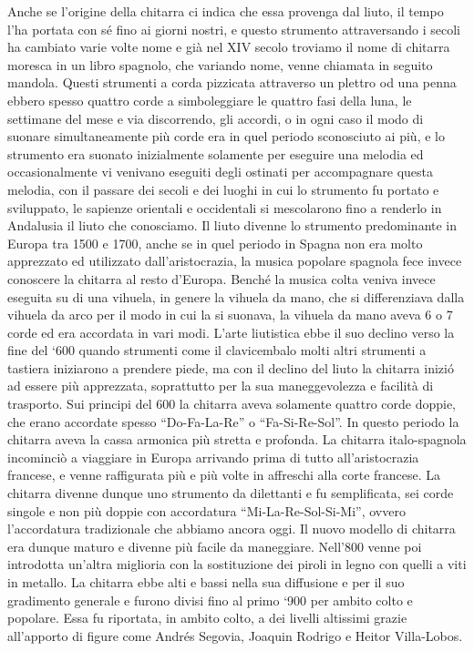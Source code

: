 \documentclass[oneside]{article}
\begin{document}
\begin{multicols*}{2}
Anche se l’origine della chitarra ci indica che essa provenga dal liuto, il tempo l’ha portata con sé fino ai giorni nostri, e questo strumento attraversando i secoli ha cambiato varie volte nome e già nel XIV secolo troviamo il nome di chitarra moresca in un libro spagnolo, che variando nome, venne chiamata in seguito mandola.
Questi strumenti a corda pizzicata attraverso un plettro od una penna ebbero spesso quattro corde a simboleggiare le quattro fasi della luna, le settimane del mese e via discorrendo, gli accordi, o in ogni caso il modo di suonare simultaneamente più corde era in quel periodo sconosciuto ai più, e lo strumento era suonato inizialmente solamente per eseguire una melodia ed occasionalmente vi venivano eseguiti degli ostinati per accompagnare questa melodia, con il passare dei secoli e dei luoghi in cui lo strumento fu portato e sviluppato, le sapienze orientali e occidentali si mescolarono fino a renderlo in Andalusia il liuto che conosciamo.
Il liuto divenne lo strumento predominante in Europa tra 1500 e 1700, anche se in quel periodo in Spagna non era molto apprezzato ed utilizzato dall’aristocrazia, la musica popolare spagnola fece invece conoscere la chitarra al resto d’Europa. Benché la musica colta veniva invece eseguita su di una vihuela, in genere la vihuela da mano, che si differenziava dalla vihuela da arco per il modo in cui la si suonava, la vihuela da mano aveva 6 o 7 corde ed era accordata in vari modi.
L’arte liutistica ebbe il suo declino verso la fine del ‘600 quando strumenti come il clavicembalo molti altri strumenti a tastiera iniziarono a prendere piede, ma con il declino del liuto la  chitarra inizió ad essere più apprezzata, soprattutto per la sua maneggevolezza e facilità di trasporto.
Sui principi del 600 la chitarra aveva solamente quattro corde doppie, che erano accordate spesso  “Do-Fa-La-Re” o “Fa-Si-Re-Sol”. 
In questo periodo la chitarra aveva la cassa armonica più stretta e profonda.
La chitarra italo-spagnola incominciò a viaggiare in Europa arrivando prima di tutto all’aristocrazia francese, e venne raffigurata più e più volte in affreschi alla corte francese.
La chitarra divenne dunque uno strumento da dilettanti e fu semplificata, sei corde singole e non più doppie con accordatura “Mi-La-Re-Sol-Si-Mi”, ovvero l’accordatura tradizionale che abbiamo ancora oggi.
Il nuovo modello di chitarra era dunque maturo e divenne più facile da maneggiare. Nell’800 venne poi introdotta un’altra miglioria con la sostituzione dei piroli in legno con quelli a viti in metallo.
La chitarra ebbe alti e bassi nella sua diffusione e per il suo gradimento generale e furono divisi fino al  primo ‘900 per ambito colto e popolare.
Essa fu riportata, in ambito colto, a dei livelli altissimi grazie all’apporto di figure come Andrés Segovia, Joaquin Rodrigo e Heitor Villa-Lobos.



\end{multicols*}
\end{document}
